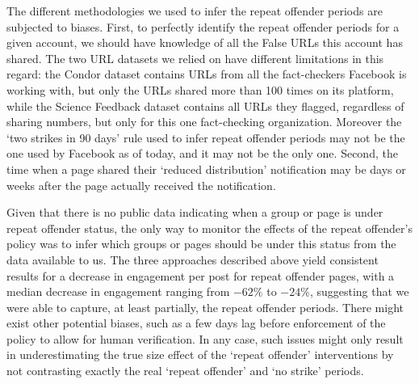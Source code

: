 \documentclass[review]{elsarticle}
\begin{document}
{{The different methodologies we used to infer the repeat offender periods are subjected to biases.
First, to perfectly identify the repeat offender periods for a given account, we should have knowledge of all the False URLs this account has shared.
The two URL datasets we relied on have different limitations in this regard: the Condor dataset contains URLs from all the fact-checkers Facebook is working with, but only the URLs shared more than 100 times on its platform, while the Science Feedback dataset contains all URLs they flagged, regardless of sharing numbers, but only for this one fact-checking organization.
Moreover the `two strikes in 90 days' rule used to infer repeat offender periods may not be the one used by Facebook as of today, and it may not be the only one.
Second, the time when a page shared their `reduced distribution' notification may be days or weeks after the page actually received the notification.

Given that there is no public data indicating when a group or page is under repeat offender status, the only way to monitor the effects of the repeat offender's policy was to infer which groups or pages should be under this status from the data available to us.
The three approaches described above yield consistent results for a decrease in engagement per post for repeat offender pages, with a median decrease in engagement ranging from $-62\%$ to $-24\%$, suggesting that we were able to capture, at least partially, the repeat offender periods.
There might exist other potential biases, such as a few days lag before enforcement of the policy to allow for human verification. 
In any case, such issues might only result in underestimating the true size effect of the `repeat offender' interventions by not contrasting exactly the real `repeat offender' and `no strike' periods.

}}
\end{document}
